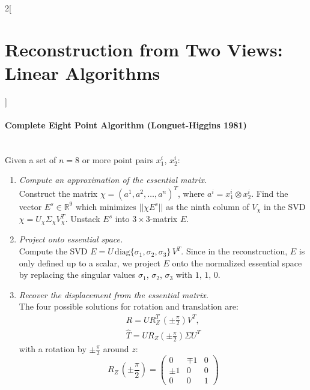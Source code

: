 \documentclass[oneside,fontsize=11pt,paper=a4]{scrartcl}
\begin{document}
\begin{multicols}{2}[\section{Reconstruction from Two Views: Linear Algorithms}]
\paragraph{Complete Eight Point Algorithm (Longuet-Higgins 1981)} \mbox{}\\
Given a set of $n = 8$ or more point pairs $x_1^i$, $x_2^i$:
\begin{enumerate}
    \item \textit{Compute an approximation of the essential matrix.}\\
    Construct the matrix $\chi = (a^1, a^2, \dots, a^n)^T$, where $a^i = x_1^i \otimes x_2^i$. Find the vector $E^s \in \mathbb{R}^9$ which minimizes $||\chi E^s||$ as the ninth column of $V_{\chi}$ in the SVD $\chi = U_{\chi} \Sigma_{\chi} V_{\chi}^T $. Unstack $E^s$ into $3 \times 3$-matrix $E$.
    \item \textit{Project onto essential space.}\\
    Compute the SVD $E = U \, \text{diag}\{\sigma_1, \sigma_2, \sigma_3\} \, V^T$. Since in the reconstruction, $E$ is only defined up to a scalar, we project $E$ onto the normalized essential space by replacing the singular values $\sigma_1$, $\sigma_2$, $\sigma_3$ with $1$, $1$, $0$.
    \item \textit{Recover the displacement from the essential matrix.}\\
    The four possible solutions for rotation and translation are:
    \begin{equation*}
    \begin{split}
        R = U R_Z^T \, (\pm \frac{\pi}{2}) V^T, \\ \hat{T} = U R_Z(\pm \frac{\pi}{2})\Sigma U^T
    \end{split}
    \end{equation*}
    with a rotation by $\pm \frac{\pi}{2}$ around $z$:
    \begin{equation*}
        R_Z \, (\pm \frac{\pi}{2}) = \begin{pmatrix} 0 & \mp 1 & 0\\ \pm 1 & 0 & 0\\0 & 0 & 1 \end{pmatrix}
    \end{equation*}
\end{enumerate}

\end{multicols}
\end{document}

